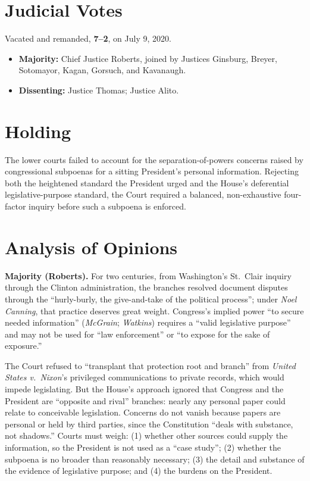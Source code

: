 \documentclass[12pt]{article}
\begin{document}
\section{Judicial Votes}

Vacated and remanded, \textbf{7--2}, on July 9, 2020.
\begin{itemize}
\item \textbf{Majority:} Chief Justice Roberts, joined by Justices Ginsburg, Breyer, Sotomayor, Kagan, Gorsuch, and Kavanaugh.
\item \textbf{Dissenting:} Justice Thomas; Justice Alito.
\end{itemize}

\section{Holding}

The lower courts failed to account for the separation-of-powers concerns raised by congressional subpoenas for a sitting President's personal information. Rejecting both the heightened standard the President urged and the House's deferential legislative-purpose standard, the Court required a balanced, non-exhaustive four-factor inquiry before such a subpoena is enforced.

\section{Analysis of Opinions}

\textbf{Majority (Roberts).} For two centuries, from Washington's St.\ Clair inquiry through the Clinton administration, the branches resolved document disputes through the ``hurly-burly, the give-and-take of the political process''; under \textit{Noel Canning}, that practice deserves great weight. Congress's implied power ``to secure needed information'' (\textit{McGrain}; \textit{Watkins}) requires a ``valid legislative purpose'' and may not be used for ``law enforcement'' or ``to expose for the sake of exposure.''

The Court refused to ``transplant that protection root and branch'' from \textit{United States v.\ Nixon}'s privileged communications to private records, which would impede legislating. But the House's approach ignored that Congress and the President are ``opposite and rival'' branches: nearly any personal paper could relate to conceivable legislation. Concerns do not vanish because papers are personal or held by third parties, since the Constitution ``deals with substance, not shadows.'' Courts must weigh: (1) whether other sources could supply the information, so the President is not used as a ``case study''; (2) whether the subpoena is no broader than reasonably necessary; (3) the detail and substance of the evidence of legislative purpose; and (4) the burdens on the President.
\end{document}
